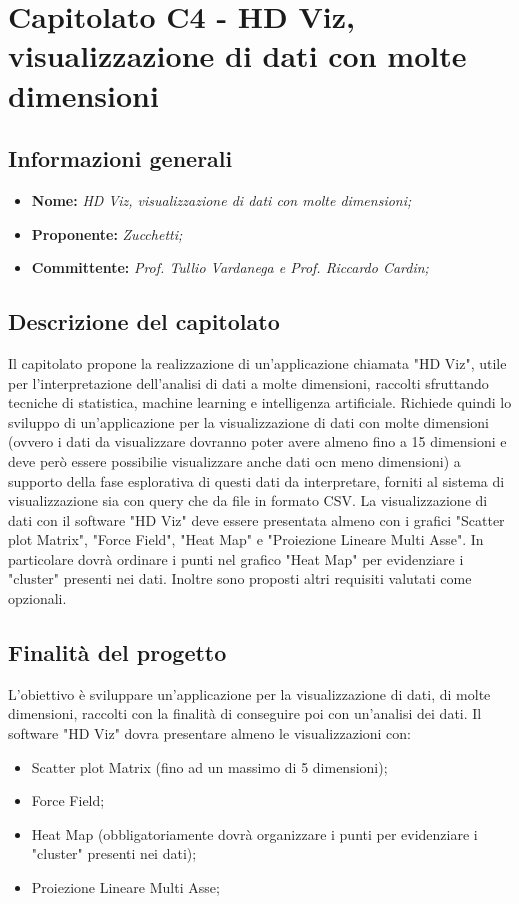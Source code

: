 \section{Capitolato C4 - HD Viz, visualizzazione di dati con molte dimensioni}
\subsection{Informazioni generali}
	\begin{itemize}
	\item \textbf{Nome:} \textit{HD Viz, visualizzazione di dati con molte dimensioni;}
	\item \textbf{Proponente:} \textit{Zucchetti;}
	\item \textbf{Committente:}  \textit{Prof. Tullio Vardanega e Prof. Riccardo Cardin;}
	\end{itemize}
\subsection{Descrizione del capitolato}
Il capitolato propone la realizzazione di un'applicazione chiamata "HD Viz", utile per l'interpretazione dell'analisi di dati a molte dimensioni, raccolti sfruttando tecniche di statistica, machine learning e intelligenza artificiale. 
Richiede quindi lo sviluppo di un'applicazione per la visualizzazione di dati con molte dimensioni (ovvero i dati da visualizzare dovranno poter avere almeno fino a 15 dimensioni e deve però essere possibilie visualizzare anche dati ocn meno dimensioni) a supporto della fase esplorativa di questi dati da interpretare, forniti al sistema di visualizzazione sia con query che da file in formato CSV.
La visualizzazione di dati con il software "HD Viz" deve essere presentata almeno con i grafici "Scatter plot Matrix", "Force Field", "Heat Map" e "Proiezione Lineare Multi Asse". In particolare dovrà ordinare i punti nel grafico "Heat Map" per evidenziare i "cluster" presenti nei dati.
Inoltre sono proposti altri requisiti valutati come opzionali.
\subsection{Finalità del progetto}
L'obiettivo è sviluppare un'applicazione per la visualizzazione di dati, di molte dimensioni, raccolti con la finalità di conseguire poi con un'analisi dei dati.
Il software "HD Viz" dovra presentare almeno le visualizzazioni con:
\begin{itemize}
\item Scatter plot Matrix (fino ad un massimo di 5 dimensioni);
\item Force Field;
\item Heat Map (obbligatoriamente dovrà organizzare i punti per evidenziare i "cluster" presenti nei dati);
\item Proiezione Lineare Multi Asse;
\end{itemize}
